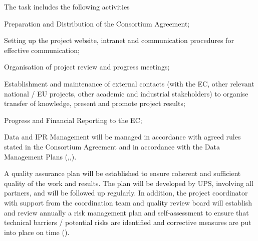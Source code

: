 \begin{workpackage}
\begin{tasklist}
\begin{task}[title=Project and financial management,
  id=project-finance-management,lead=PS,PM=33,wphases={0-48!.2,0-3,10-12,22-24,34-36,42-48},
  partners={LL,UV,UJF,UB,UO,USH,USO,SA,UW,JU,UK,US,ZH,SR}]
The task includes the following activities
  \begin{compactitem}
  \item Preparation and Distribution of the
    Consortium Agreement;
  \item Setting up the project website, intranet and
    communication procedures for effective communication;
  \item
    Organisation of project review and progress meetings;
  \item
    Establishment and maintenance of external contacts (with the EC,
    other relevant national / EU projects, other academic and
    industrial stakeholders) to organise transfer of knowledge,
    present and promote project results;
  \item Progress and Financial Reporting to the EC;
  \item Data and IPR Management will be managed in accordance with
    agreed rules stated in the Consortium Agreement and in accordance
    with the Data Management Plans
    (,,).
  \end{compactitem}
\end{task}

\begin{task}[title=Quality assurance and risk management,id=project-quality-management,
  wphases=6-48!.3,
  lead=PS,PM=15,partners={LL,UV,UJF,UB,UO,USH,USO,SA,UW,JU,UK,US,ZH,SR}]
  A quality assurance plan will be established to ensure coherent and
  sufficient quality of the work and results. The plan will be
  developed by UPS, involving all partners, and will be followed up
  regularly. In addition, the project coordinator with support from
  the coordination team and quality review board will establish and
  review annually a risk management plan and self-assessment to ensure
  that technical barriers / potential risks are identified and
  corrective measures are put into place on time
  ().
\end{task}


\end{tasklist}
\end{workpackage}
